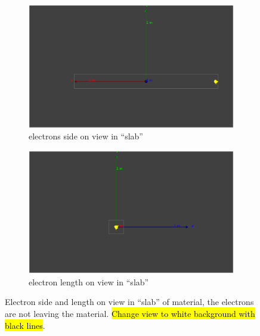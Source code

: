 \begin{figure}[htbp]
\centering
\begin{subfigure}{.5\textwidth}
  \centering
  \includegraphics[width=\linewidth]{e-_10MeV_Length_on_view.png}
  \captionsetup{width=.9\linewidth}
  \caption{electrons side on view in ``slab''}
  \label{subFig:electron_side_slab}
\end{subfigure}%
\begin{subfigure}{.5\textwidth}
  \centering
  \includegraphics[width=\linewidth]{e-_10MeV_side_on_view.png}
  \captionsetup{width=.9\linewidth}
  \caption{electron length on view in ``slab''}
  \label{subFig:electron_length_slab}
\end{subfigure}
\caption{Electron side and length on view in ``slab'' of material, the electrons are not leaving the material. \hl{Change view to white background with black lines}.}
\label{fig:electrons_viewed_in_slab}
\end{figure}

